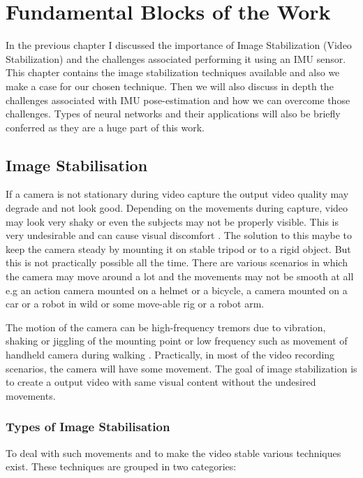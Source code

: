 \chapter{Fundamental Blocks of the Work} \label{chapter_two}

In the previous chapter I discussed the importance of Image Stabilization (Video Stabilization) and the challenges associated performing it using an IMU sensor. This chapter contains the image stabilization techniques available and also we make a case for our chosen technique. Then we will also discuss in depth the challenges associated with IMU pose-estimation and how we can overcome those challenges. Types of neural networks and their applications will also be briefly conferred as they are a huge part of this work.

\section{Image Stabilisation}
\label{sec:image_stab}
If a camera is not stationary during video capture the output video quality may degrade and not look good. Depending on the movements during capture, video may look very shaky or even the subjects may not be properly visible. This is very undesirable and can cause visual discomfort \citep{jia2012probabilistic}. The solution to this maybe to keep the camera steady by mounting it on stable tripod or to a rigid object. But this is not practically possible all the time. There are various scenarios in which the camera may move around a lot and the movements may not be smooth at all e.g an action camera mounted on a helmet or a bicycle, a camera mounted on a car or a robot in wild or some move-able rig or a robot arm.

The motion of the camera can be high-frequency tremors due to vibration, shaking or jiggling of the mounting point \citep{ryu2012robust} or low frequency such as movement of handheld camera during walking \citep{dis_review}. Practically, in most of the video recording scenarios, the camera will have some movement. The goal of image stabilization is to create a output video with same visual content without the undesired movements. 

\subsection{Types of Image Stabilisation}
To deal with such movements and to make the video stable various techniques exist. These techniques are grouped in two categories:

